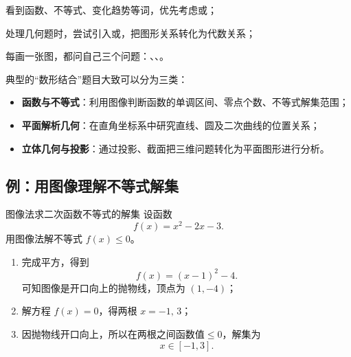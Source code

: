 \documentclass[a4paper,11pt]{ctexart}
\begin{document}
\begin{focuspoints}
  \item 看到函数、不等式、变化趋势等词，优先考虑或；
  \item 处理几何题时，尝试引入或，把图形关系转化为代数关系；
  \item 每画一张图，都问自己三个问题：、、。
\end{focuspoints}

典型的“数形结合”题目大致可以分为三类：
\begin{itemize}
  \item \textbf{函数与不等式}：利用图像判断函数的单调区间、零点个数、不等式解集范围；
  \item \textbf{平面解析几何}：在直角坐标系中研究直线、圆及二次曲线的位置关系；
  \item \textbf{立体几何与投影}：通过投影、截面把三维问题转化为平面图形进行分析。
\end{itemize}

\subsection{例：用图像理解不等式解集}

\begin{examplebox}{图像法求二次函数不等式的解集}
设函数
\[
f(x)=x^2-2x-3.
\]
用图像法解不等式 $f(x)\le 0$。

\begin{enumerate}
  \item 完成平方，得到
  \[
  f(x)=(x-1)^2-4.
  \]
  可知图像是开口向上的抛物线，顶点为 $(1,-4)$；
  \item 解方程 $f(x)=0$，得两根 $x=-1,\,3$；
  \item 因抛物线开口向上，所以在两根之间函数值$\le 0$，解集为
  \[
  x\in[-1,3].
  \]
\end{enumerate}
\end{examplebox}

\begin{center}
\end{center}
\end{document}
